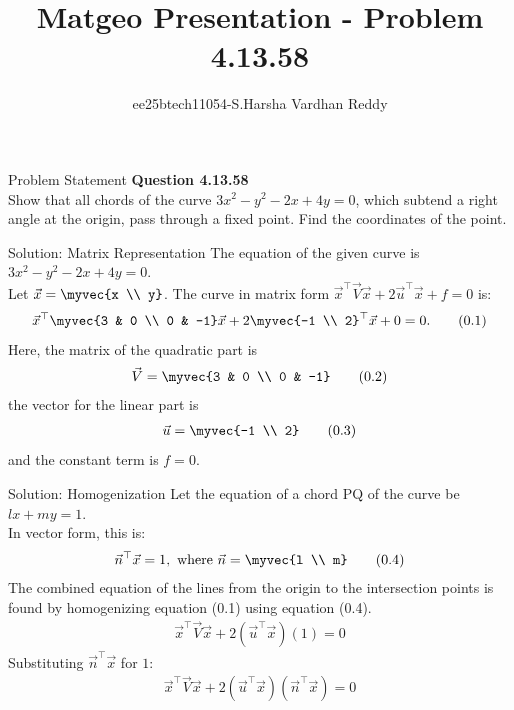 \documentclass{beamer}
\title{Matgeo Presentation - Problem 4.13.58}
\author{ee25btech11054-S.Harsha Vardhan Reddy}
\numberwithin{equation}{section}
\theoremstyle{remark}
\begin{document}
\begin{frame}
  \titlepage
\end{frame}

\begin{frame}{Problem Statement}
\textbf{Question 4.13.58} \\
Show that all chords of the curve $3x^2 - y^2 - 2x + 4y = 0$, which subtend a right angle at the origin, pass through a fixed point. Find the coordinates of the point.
\end{frame}

\begin{frame}{Solution: Matrix Representation}
The equation of the given curve is $3x^2 - y^2 - 2x + 4y = 0$. \\
Let $\vec{x} = \myvec{x \\ y}$. The curve in matrix form $\vec{x}^\top {\vec{V}}\vec{x} + 2\vec{u}^\top\vec{x} + f = 0$ is:
\begin{align}
\vec{x}^\top \myvec{3 & 0 \\ 0 & -1} \vec{x} + 2\myvec{-1 \\ 2}^\top\vec{x} + 0 = 0. \tag{0.1}
\end{align}
Here, the matrix of the quadratic part is 
\begin{align}
\vec{V} = \myvec{3 & 0 \\ 0 & -1} \tag{0.2}
\end{align}
the vector for the linear part is 
\begin{align}
\vec{u} = \myvec{-1 \\ 2} \tag{0.3}
\end{align}
and the constant term is $f=0$.
\end{frame}

\begin{frame}{Solution: Homogenization}
Let the equation of a chord PQ of the curve be $lx + my = 1 $.\\
In vector form, this is:
\begin{align}
\vec{n}^\top\vec{x} = 1, \text{ where } \vec{n} = \myvec{l \\ m} \tag{0.4}
\end{align}
The combined equation of the lines from the origin to the intersection points is found by homogenizing equation (0.1) using equation (0.4).
\begin{align}
\vec{x}^\top {\vec{V}}\vec{x} + 2(\vec{u}^\top\vec{x})(1) = 0 \tag{0.5}
\end{align}
Substituting $\vec{n}^\top\vec{x}$ for $1$:
\begin{align}
\vec{x}^\top {\vec{V}}\vec{x} + 2(\vec{u}^\top\vec{x})(\vec{n}^\top\vec{x}) = 0 \tag{0.6}
\end{align}
\end{frame}
\end{document}
